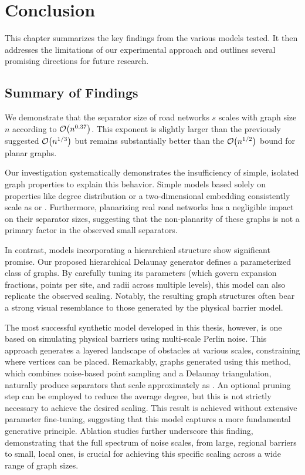 \chapter{Conclusion}
\label{ch:conclusion}

This chapter summarizes the key findings from the various models tested. It then addresses the limitations of our experimental approach and outlines several promising directions for future research.

\section{Summary of Findings}
\label{sec:conclusion:summary}

We demonstrate that the separator size of road networks \(s\) scales with graph size \(n\) according to \(\mathcal{O}\!\left(n^{0.37}\right)\).
This exponent is slightly larger than the previously suggested \(\mathcal{O}\!\left(n^{1/3}\right)\) \cite{dibbelt_customizable_2016} but remains substantially better than the \(\mathcal{O}\!\left(n^{1/2}\right)\) bound for planar graphs.

Our investigation systematically demonstrates the insufficiency of simple, isolated graph properties to explain this behavior.
Simple models based solely on properties like degree distribution or a two-dimensional embedding consistently scale as  or .
Furthermore, planarizing real road networks has a negligible impact on their separator sizes, suggesting that the non-planarity of these graphs is not a primary factor in the observed small separators.

In contrast, models incorporating a hierarchical structure show significant promise.
Our proposed hierarchical Delaunay generator defines a parameterized class of graphs.
By carefully tuning its parameters (which govern expansion fractions, points per site, and radii across multiple levels), this model can also replicate the observed  scaling.
Notably, the resulting graph structures often bear a strong visual resemblance to those generated by the physical barrier model.

The most successful synthetic model developed in this thesis, however, is one based on simulating physical barriers using multi-scale Perlin noise.
This approach generates a layered landscape of obstacles at various scales, constraining where vertices can be placed.
Remarkably, graphs generated using this method, which combines noise-based point sampling and a Delaunay triangulation, naturally produce separators that scale approximately as .
An optional pruning step can be employed to reduce the average degree, but this is not strictly necessary to achieve the desired scaling.
This result is achieved without extensive parameter fine-tuning, suggesting that this model captures a more fundamental generative principle.
Ablation studies further underscore this finding, demonstrating that the full spectrum of noise scales, from large, regional barriers to small, local ones, is crucial for achieving this specific scaling across a wide range of graph sizes.

